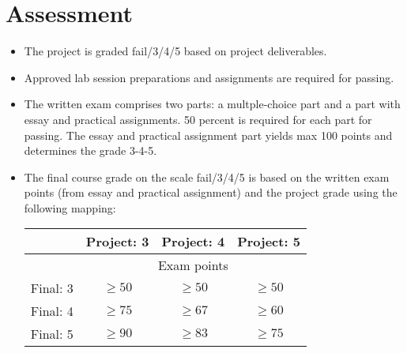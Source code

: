 \section{Assessment}
\begin{itemize}
\item The project is graded fail/3/4/5 based on project deliverables.
\item Approved lab session preparations and assignments are required for passing.
\item The written exam comprises two parts: a multple-choice part and a part with essay and practical assignments. 50 percent is required for each part for passing. The essay and practical assignment part yields max 100 points and determines the grade 3-4-5.
\item The final course grade on the scale fail/3/4/5 is based on the written exam points (from essay and practical assignment) and the project grade using the following mapping: 

\begin{tabular}{r | c c c}
 & Project: 3 & Project: 4 & Project: 5 \\
\hline
 & \multicolumn{3}{c}{Exam points}    \\
Final: 3 & $ \geq 50$ & $\geq 50$ & $\geq 50$ \\
Final: 4 & $ \geq 75$ & $\geq 67$ & $\geq 60$ \\
Final: 5 & $ \geq 90$ & $\geq 83$ & $\geq 75$ \\
\hline
\end{tabular}


\end{itemize}



